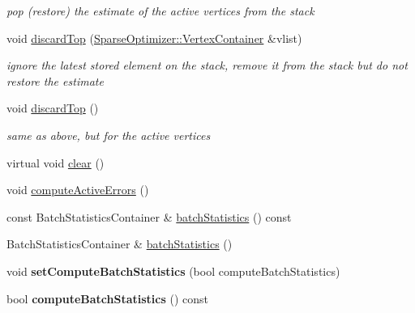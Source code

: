 \begin{DoxyCompactItemize}
\begin{DoxyCompactList}\small\item\em pop (restore) the estimate of the active vertices from the stack \end{DoxyCompactList}\item 
\hypertarget{classg2o_1_1SparseOptimizer_ac6344493dc9f66d5443759ff9f2abf6c}{void \hyperlink{classg2o_1_1SparseOptimizer_ac6344493dc9f66d5443759ff9f2abf6c}{discard\-Top} (\hyperlink{structg2o_1_1OptimizableGraph_a54f01b9b6071e65e6abeebe4afb29dec}{Sparse\-Optimizer\-::\-Vertex\-Container} \&vlist)}\label{classg2o_1_1SparseOptimizer_ac6344493dc9f66d5443759ff9f2abf6c}

\begin{DoxyCompactList}\small\item\em ignore the latest stored element on the stack, remove it from the stack but do not restore the estimate \end{DoxyCompactList}\item 
\hypertarget{classg2o_1_1SparseOptimizer_a20ed9e9f1201bfb874456a8d30f169fb}{void \hyperlink{classg2o_1_1SparseOptimizer_a20ed9e9f1201bfb874456a8d30f169fb}{discard\-Top} ()}\label{classg2o_1_1SparseOptimizer_a20ed9e9f1201bfb874456a8d30f169fb}

\begin{DoxyCompactList}\small\item\em same as above, but for the active vertices \end{DoxyCompactList}\item 
virtual void \hyperlink{classg2o_1_1SparseOptimizer_a4881e4ac9ba9a58d4e249dc03ef9683d}{clear} ()
\item 
void \hyperlink{classg2o_1_1SparseOptimizer_a09572668aa85b75a5bebf7b66401ce8f}{compute\-Active\-Errors} ()
\item 
const Batch\-Statistics\-Container \& \hyperlink{classg2o_1_1SparseOptimizer_ac0b9e0f3c9d05f600882b9c9b8a5c7c1}{batch\-Statistics} () const 
\item 
Batch\-Statistics\-Container \& \hyperlink{classg2o_1_1SparseOptimizer_aa93ecf8d3b99e2eef3709a5c70cc8632}{batch\-Statistics} ()
\item 
\hypertarget{classg2o_1_1SparseOptimizer_a775fe12d7df941acbbd86bcf838f0f3c}{void {\bfseries set\-Compute\-Batch\-Statistics} (bool compute\-Batch\-Statistics)}\label{classg2o_1_1SparseOptimizer_a775fe12d7df941acbbd86bcf838f0f3c}

\item 
\hypertarget{classg2o_1_1SparseOptimizer_a4a4261f1008f1b0f660381b9c46b78f7}{bool {\bfseries compute\-Batch\-Statistics} () const }\label{classg2o_1_1SparseOptimizer_a4a4261f1008f1b0f660381b9c46b78f7}


\end{DoxyCompactItemize}

